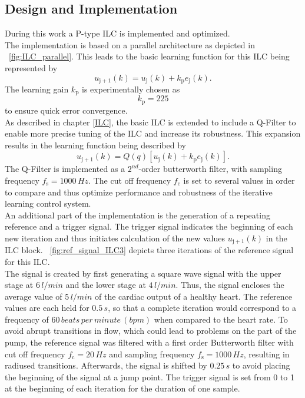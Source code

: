\subsection{Design and Implementation}
During this work a P-type ILC is implemented and optimized.
\\The implementation is based on a parallel architecture as depicted in \figurename~\ref{fig:ILC_parallel}. This leads to the basic learning function for this ILC being represented by
\begin{equation}
  u_{\mathrm{j+1}}(k) = u_{\mathrm{j}}(k)+k_{\mathrm{p}}e_{\mathrm{j}}(k).
\end{equation}
The learning gain $k_{\mathrm{p}}$ is experimentally chosen as
\begin{equation}
  k_{\mathrm{p}} = 225
\end{equation}
to ensure quick error convergence.
\\As described in chapter \ref{ILC}, the basic ILC is extended to include a Q-Filter to enable more precise tuning of the ILC and increase its robustness.
This expansion results in the learning function being described by
\begin{equation}
  u_{\mathrm{j+1}}(k) = Q(q)[u_{\mathrm{j}}(k)+k_{\mathrm{p}}e_{\mathrm{j}}(k)].
\end{equation}
The Q-Filter is implemented as a $2^{nd}$-order butterworth filter, with sampling frequency $f_{\mathrm{s}}=1000\,Hz$. The cut off frequency $f_{\mathrm{c}}$ is set to several values in order to compare and thus optimize performance and robustness of the iterative learning control system.
\\An additional part of the implementation is the generation of a repeating reference and a trigger signal. The trigger signal indicates the beginning of each new iteration and thus initiates calculation of the new values $u_{\mathrm{j+1}}(k)$ in the ILC block.
\figurename~\ref{fig:ref_signal_ILC3} depicts three iterations of the reference signal for this ILC.
\\The signal is created by first generating a square wave signal with the upper stage at $6\, l/min$ and the lower stage at $4\, l/min$. Thus, the signal encloses the average value of $5\, l/min$ of the cardiac output of a healthy heart. The reference values are each held for $0.5\, s$, so that a complete iteration would correspond to a frequency of $60\, beats\, per\, minute\, (bpm)$ when compared to the heart rate. To avoid abrupt transitions in flow, which could lead to problems on the part of the pump, the reference signal was filtered with a first order Butterworth filter with cut off frequency $f_{\mathrm{c}}=20\,Hz$ and sampling frequency $f_{\mathrm{s}}=1000\,Hz$, resulting in radiused transitions. Afterwards, the signal is shifted by $0.25\, s$ to avoid placing the beginning of the signal at a jump point. The trigger signal is set from 0 to 1 at the beginning of each iteration for the duration of one sample.
